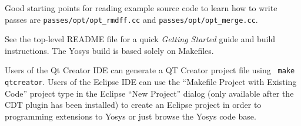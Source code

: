 Good starting points for reading example source code to learn how to write passes
are {\tt passes/opt/opt\_rmdff.cc} and {\tt passes/opt/opt\_merge.cc}.

See the top-level README file for a quick {\it Getting Started} guide and build
instructions. The Yosys build is based solely on Makefiles.

Users of the Qt Creator IDE can generate a QT Creator project file using {\tt
make qtcreator}. Users of the Eclipse IDE can use the ``Makefile Project with
Existing Code'' project type in the Eclipse ``New Project'' dialog (only
available after the CDT plugin has been installed) to create an Eclipse project
in order to programming extensions to Yosys or just browse the Yosys code base.

